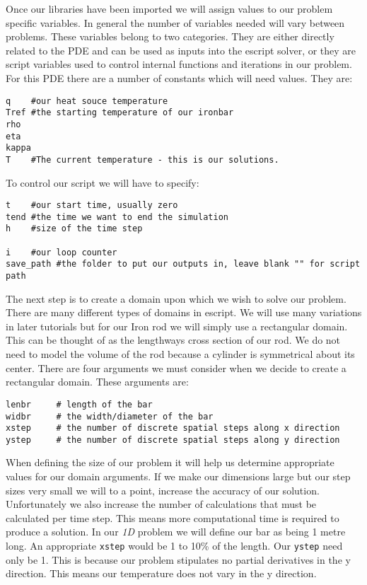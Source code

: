 \documentclass{manual}
\begin{document}
Once our libraries have been imported we will assign values to our problem specific variables. In general the number of variables needed will vary between problems. These variables belong to two categories. They are either directly related to the PDE and can be used as inputs into the escript solver, or they are script variables used to control internal functions and iterations in our problem. 
For this PDE there are a number of constants which will need values. They are:
\begin{verbatim}
q    #our heat souce temperature
Tref #the starting temperature of our ironbar
rho
eta
kappa
T    #The current temperature - this is our solutions.
\end{verbatim}
To control our script we will have to specify:
\begin{verbatim}
t    #our start time, usually zero
tend #the time we want to end the simulation
h    #size of the time step

i    #our loop counter
save_path #the folder to put our outputs in, leave blank "" for script path

\end{verbatim}
The next step is to create a domain upon which we wish to solve our problem. There are many different types of domains in escript. We will use many variations in later tutorials but for our Iron rod we will simply use a rectangular domain. This can be thought of as the lengthways cross section of our rod. We do not need to model the volume of the rod because a cylinder is symmetrical about its center. There are four arguments we must consider when we decide to create a rectangular domain. These arguments are:
\begin{verbatim}
lenbr     # length of the bar
widbr     # the width/diameter of the bar
xstep     # the number of discrete spatial steps along x direction
ystep     # the number of discrete spatial steps along y direction
\end{verbatim}
When defining the size of our problem it will help us determine appropriate values for our domain arguments. If we make our dimensions large but our step sizes very small we will to a point, increase the accuracy of our solution. Unfortunately we also increase the number of calculations that must be calculated per time step. This means more computational time is required to produce a solution.
In our \textit{1D} problem we will define our bar as being 1 metre long. An appropriate \verb|xstep| would be 1 to 10\% of the length. Our \verb|ystep| need only be 1. This is because our problem stipulates no partial derivatives in the y direction. This means our temperature does not vary in the y direction.
\end{document}
